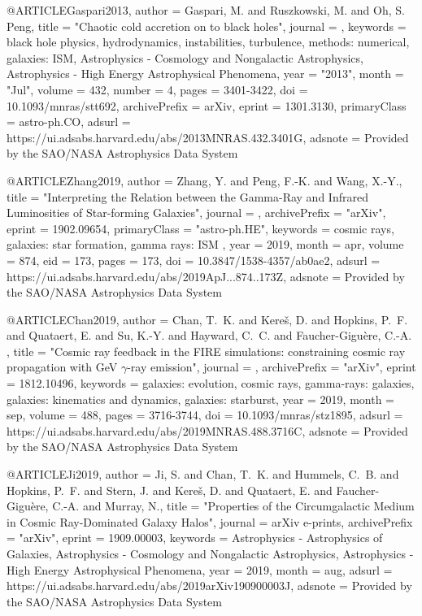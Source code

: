 \documentclass[useAMS,usenatbib]{mnras}
\begin{document}
{{{{{{@ARTICLE{Gaspari2013,
       author = {{Gaspari}, M. and {Ruszkowski}, M. and {Oh}, S. Peng},
        title = "{Chaotic cold accretion on to black holes}",
      journal = {\mnras},
     keywords = {black hole physics, hydrodynamics, instabilities, turbulence, methods: numerical, galaxies: ISM, Astrophysics - Cosmology and Nongalactic Astrophysics, Astrophysics - High Energy Astrophysical Phenomena},
         year = "2013",
        month = "Jul",
       volume = {432},
       number = {4},
        pages = {3401-3422},
          doi = {10.1093/mnras/stt692},
archivePrefix = {arXiv},
       eprint = {1301.3130},
 primaryClass = {astro-ph.CO},
       adsurl = {https://ui.adsabs.harvard.edu/abs/2013MNRAS.432.3401G},
      adsnote = {Provided by the SAO/NASA Astrophysics Data System}
}

@ARTICLE{Zhang2019,
   author = {{Zhang}, Y. and {Peng}, F.-K. and {Wang}, X.-Y.},
    title = "{Interpreting the Relation between the Gamma-Ray and Infrared Luminosities of Star-forming Galaxies}",
  journal = {\apj},
archivePrefix = "arXiv",
   eprint = {1902.09654},
 primaryClass = "astro-ph.HE",
 keywords = {cosmic rays, galaxies: star formation, gamma rays: ISM },
     year = 2019,
    month = apr,
   volume = 874,
      eid = {173},
    pages = {173},
      doi = {10.3847/1538-4357/ab0ae2},
   adsurl = {https://ui.adsabs.harvard.edu/abs/2019ApJ...874..173Z},
  adsnote = {Provided by the SAO/NASA Astrophysics Data System}
}

@ARTICLE{Chan2019,
   author = {{Chan}, T.~K. and {Kere{\v s}}, D. and {Hopkins}, P.~F. and 
	{Quataert}, E. and {Su}, K.-Y. and {Hayward}, C.~C. and {Faucher-Gigu{\`e}re}, C.-A.
	},
    title = "{Cosmic ray feedback in the FIRE simulations: constraining cosmic ray propagation with GeV {$\gamma$}-ray emission}",
  journal = {\mnras},
archivePrefix = "arXiv",
   eprint = {1812.10496},
 keywords = {galaxies: evolution, cosmic rays, gamma-rays: galaxies, galaxies: kinematics and dynamics, galaxies: starburst},
     year = 2019,
    month = sep,
   volume = 488,
    pages = {3716-3744},
      doi = {10.1093/mnras/stz1895},
   adsurl = {https://ui.adsabs.harvard.edu/abs/2019MNRAS.488.3716C},
  adsnote = {Provided by the SAO/NASA Astrophysics Data System}
}

@ARTICLE{Ji2019,
   author = {{Ji}, S. and {Chan}, T.~K. and {Hummels}, C.~B. and {Hopkins}, P.~F. and 
	{Stern}, J. and {Kere{\v s}}, D. and {Quataert}, E. and {Faucher-Gigu{\`e}re}, C.-A. and 
	{Murray}, N.},
    title = "{Properties of the Circumgalactic Medium in Cosmic Ray-Dominated Galaxy Halos}",
  journal = {arXiv e-prints},
archivePrefix = "arXiv",
   eprint = {1909.00003},
 keywords = {Astrophysics - Astrophysics of Galaxies, Astrophysics - Cosmology and Nongalactic Astrophysics, Astrophysics - High Energy Astrophysical Phenomena},
     year = 2019,
    month = aug,
   adsurl = {https://ui.adsabs.harvard.edu/abs/2019arXiv190900003J},
  adsnote = {Provided by the SAO/NASA Astrophysics Data System}
}

}}}}}}
\end{document}
